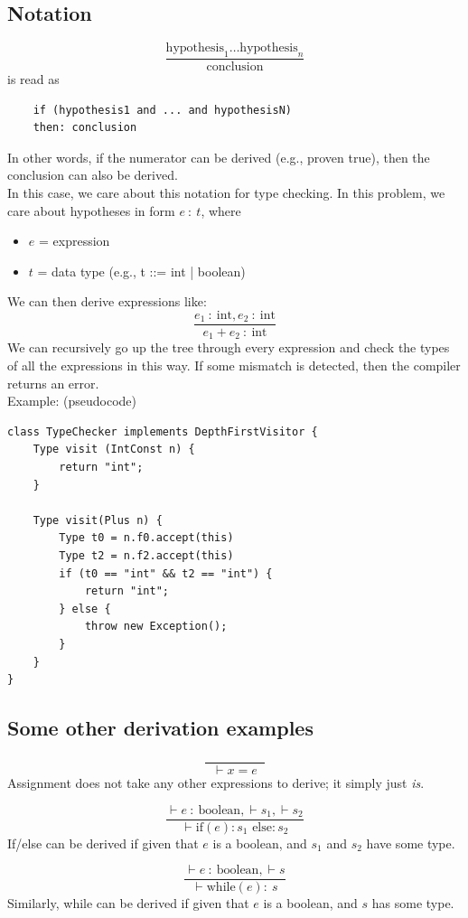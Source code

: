\documentclass[10pt]{article}
\begin{document}
\subsection*{Notation}
\[\frac{\text{hypothesis}_1 \dots \text{hypothesis}_n}{\text{conclusion}}\]
is read as
\begin{verbatim}
    if (hypothesis1 and ... and hypothesisN)
    then: conclusion
\end{verbatim}
In other words, if the numerator can be derived (e.g., proven true), then the conclusion can also be derived.\\
In this case, we care about this notation for type checking.  In this problem, we care about hypotheses in form $e\::\:t$, where
\begin{itemize}
    \item $e$ = expression
    \item $t$ = data type (e.g., t ::= int | boolean)
\end{itemize}
We can then derive expressions like:
\[\frac{e_1 \::\: \text{int}, e_2 \::\: \text{int}}{e_1 + e_2 \::\: \text{int}}\]
We can recursively go up the tree through every expression and check the types of all the expressions in this way.  If some mismatch is detected, then the compiler returns an error.\\
Example: (pseudocode)
\begin{verbatim}
class TypeChecker implements DepthFirstVisitor {
    Type visit (IntConst n) {
        return "int";
    }

    Type visit(Plus n) {
        Type t0 = n.f0.accept(this)
        Type t2 = n.f2.accept(this)
        if (t0 == "int" && t2 == "int") {
            return "int";
        } else {
            throw new Exception();
        }
    }
}
\end{verbatim}

\subsection*{Some other derivation examples}

\[\frac{\hspace{2cm}}{\vdash x = e}\]
Assignment does not take any other expressions to derive; it simply just \textit{is}.

\[\frac{\vdash e \::\: \text{boolean}, \vdash s_1, \vdash s_2}{\vdash \text{if}(e): s_1 \text{ else}: s_2}\]
If/else can be derived if given that $e$ is a boolean, and $s_1$ and $s_2$ have some type.


\[\frac{\vdash e \::\: \text{boolean}, \vdash s}{\vdash \text{while} (e): \:s}\]
Similarly, while can be derived if given that $e$ is a boolean, and $s$ has some type.
\end{document}

